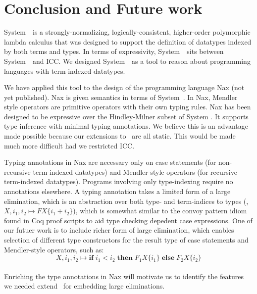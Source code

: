 \section{Conclusion and Future work}
\label{sec:concl}

System~\Fi\ is a strongly-normalizing, logically-consistent, higher-order
polymorphic lambda calculus that was designed to support the
definition of datatypes indexed by both terms and types.
In terms of expressivity, System~\Fi\ sits between System~\Fw\ and ICC.
We designed System~\Fi\ as a tool to reason about programming
languages with term-indexed datatypes. 

We have applied this tool to the design of the programming language Nax (not yet published).
Nax is given semantics in terms of System~\Fi . In Nax, Mendler style operators
are primitive operators with their own typing rules. Nax has been designed to
be expressive over the Hindley-Milner subset of System \Fi. It supports type
inference with minimal typing annotations. We believe this is an advantage
made possible because our extensions to \Fw\ are all static. This would be made
much more difficult had we restricted ICC.

Typing annotations in Nax are necessary only
on case statements (for non-recursive term-indexed datatypes)
and Mendler-style operators (for recursive term-indexed datatypes).
Programs involving only type-indexing require no annotations elsewhere.
A typing annotation takes a limited form of a large elimination,
which is an abstraction over both type- and term-indices to types
(\eg, $X,i_1,i_2 \mapsto F X \{i_1 + i_2\}$), which is somewhat similar to
the convoy pattern idiom \cite{cpdt} found in Coq proof scripts to aid
type checking depedent case expressions.
One of our futuer work
is to include richer form of large elimination, which enables selection
of different type constructors for the result type of case statements
and Mendler-style operators, such as:\vspace*{-5pt}
\[ X,i_1,i_2 \mapsto \textbf{if}\;i_1<i_2\;
	\textbf{then}\; F_1 X \{i_1\}\;\textbf{else}\;F_2 X \{i_2\} \]
~ \vspace*{-15pt} \\
Enriching the type annotations in Nax will motivate us to identify
the features we needed extend \Fi\ for embedding large eliminations.

 
